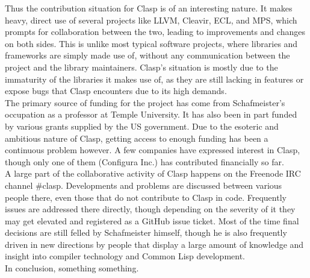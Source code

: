 Thus the contribution situation for Clasp is of an interesting nature. It makes heavy, direct use of several projects like LLVM, Cleavir, ECL, and MPS, which prompts for collaboration between the two, leading to improvements and changes on both sides. This is unlike most typical software projects, where libraries and frameworks are simply made use of, without any communication between the project and the library maintainers. Clasp's situation is mostly due to the immaturity of the libraries it makes use of, as they are still lacking in features or expose bugs that Clasp encounters due to its high demands. \\

The primary source of funding for the project has come from Schafmeister's occupation as a professor at Temple University. It has also been in part funded by various grants supplied by the US government\cite{clasp-grants}. Due to the esoteric and ambitious nature of Clasp, getting access to enough funding has been a continuous problem however. A few companies have expressed interest in Clasp, though only one of them (Configura Inc.) has contributed financially so far. \\

A large part of the collaborative activity of Clasp happens on the Freenode IRC channel \#clasp. Developments and problems are discussed between various people there, even those that do not contribute to Clasp in code. Frequently issues are addressed there directly, though depending on the severity of it they may get elevated and registered as a GitHub issue ticket. Most of the time final decisions are still felled by Schafmeister himself, though he is also frequently driven in new directions by people that display a large amount of knowledge and insight into compiler technology and Common Lisp development. \\

In conclusion, something something.

